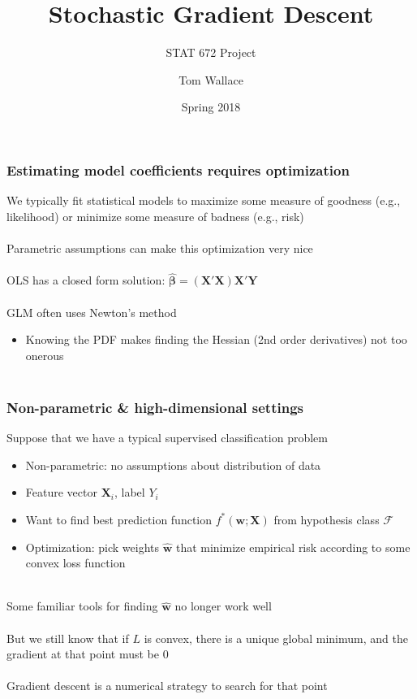 \documentclass{beamer}
\title{Stochastic Gradient Descent}
\subtitle{STAT 672 Project}
\author{Tom Wallace}
\institute{George Mason University}
\date{Spring 2018}
\begin{document}
\frame{\titlepage}


\begin{frame}
	\frametitle{Estimating model coefficients requires optimization}
	We typically fit statistical models to maximize some measure of goodness
	(e.g., likelihood) or minimize some measure of badness (e.g., risk)
	\\~\\

	Parametric assumptions can make this optimization very nice \\~\\

	OLS has a closed form solution: $\hat{\bm{\beta}} =
	(\bm{X}'\bm{X})\bm{X}'\bm{Y}$ \\~\\

	GLM often uses Newton's method
	\begin{itemize}
		\item \small Knowing the PDF makes finding the
			Hessian (2nd order derivatives) not too onerous \\~\\
	\end{itemize}

\end{frame}

\begin{frame}
	\frametitle{Non-parametric \& high-dimensional settings}
	Suppose that we have a typical supervised classification problem
	\begin{itemize}
		\item \small Non-parametric: no assumptions about distribution of data
		\item Feature vector $\mathbf{X}_i$, label $Y_i$
		\item Want to find best prediction function $f^*(\bm{w}; \bm{X})$ from
			hypothesis class $\mathcal{F}$
		\item Optimization: pick weights $\hat{\bm{w}}$ that minimize
			empirical risk according to some convex
			loss function \\~\\
	\end{itemize}

	Some familiar tools for finding $\hat{\mathbf{w}}$ no longer work well
	\\~\\

	But we still know that if $L$ is convex, there is a unique global
	minimum, and the gradient at that point must be 0 \\~\\

	Gradient descent is a numerical strategy to search for that point
\end{frame}
\end{document}
